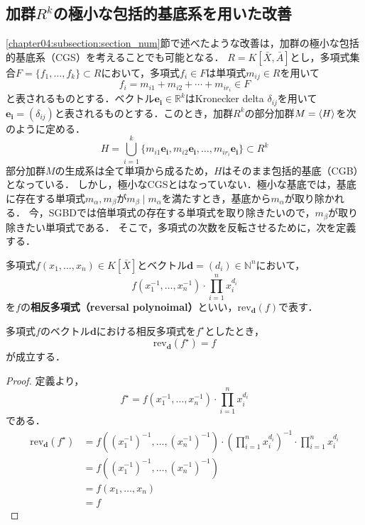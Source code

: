 \subsection{加群$R^k$の極小な包括的\groebner{}基底系を用いた改善}
\ref{chapter04:subsection:section_num}節で述べたような改善は，加群の極小な包括的\groebner{}基底系（CGS）を考えることでも可能となる．
$R = K[\bar{X}, \bar{A}]$とし，多項式集合$F = \{f_1, \dots, f_k\} \subset R$において，多項式$f_i \in F$は単項式$m_{ij} \in R$を用いて
$$f_i = m_{i1} + m_{i2} + \cdots + m_{ir_i} \in F$$
と表されるものとする．ベクトル$\bm{e_i} \in \mathbb{R}^k$はKronecker delta $\delta_{ij}$を用いて$\bm{e_i} = (\delta_{ij})$と表されるものとする．このとき，加群$R^k$の部分加群$M = \langle H \rangle$を次のように定める．
$$H = \bigcup_{i=1}^k \{m_{i1}\bm{e_i}, m_{i2}\bm{e_i}, \dots, m_{ir_i}\bm{e_i}\} \subset R^k$$
部分加群$M$の生成系は全て単項から成るため，$H$はそのまま包括的\groebner{}基底（CGB）となっている．
しかし，極小なCGSとはなっていない．極小な\groebner{}基底では，基底に存在する単項式$m_\alpha, m_\beta$が$m_\beta \mid m_\alpha$を満たすとき，基底から$m_\alpha$が取り除かれる．
今，SGBDでは倍単項式の存在する単項式を取り除きたいので，$m_\beta$が取り除きたい単項式である．
そこで，多項式の次数を反転させるために，次を定義する．
\begin{definition}
	多項式$f(x_1, \dots, x_n) \in K[\bar{X}]$とベクトル$\bm{d} = (d_i) \in \mathbb{N}^n$において，
	$$f(x_1^{-1}, \dots, x_n^{-1})\cdot \prod_{i=1}^n x_i^{d_i}$$
	を$f$の\textbf{相反多項式（reversal polynoimal）}といい，$\mathrm{rev}_{\bm{d}}(f)$で表す．
\end{definition}
\begin{theorem}
	\label{chapter04:theorem_reversal_poly}
	多項式$f$のベクトル$\bm{d}$における相反多項式を$f^\star$としたとき，
	$$\mathrm{rev}_{\bm{d}}(f^\star) = f$$
	が成立する．
\end{theorem}
\begin{proof}
	定義より，
	$$f^\star = f(x_1^{-1}, \dots, x_n^{-1})\cdot \prod_{i=1}^n x_i^{d_i}$$
	である．
	\begin{align*}
		\mathrm{rev}_{\bm{d}}(f^\star) &=  f\left( (x_1^{-1})^{-1}, \dots, (x_n^{-1})^{-1} \right)\cdot \left( \prod_{i=1}^n x_i^{d_i}\right)^{-1}  \cdot \prod_{i=1}^n x_i^{d_i} \\
		&= f((x_1^{-1})^{-1}, \dots, (x_n^{-1})^{-1}) \\
		&= f(x_1, \dots, x_n) \\
		&= f
	\end{align*}
\end{proof}
